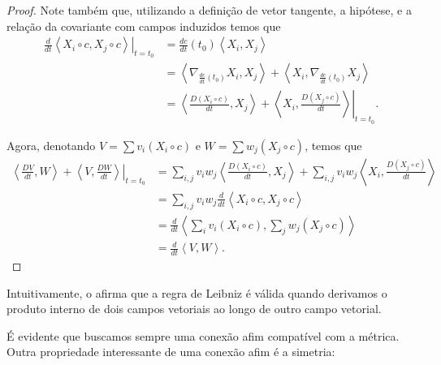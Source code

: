 \begin{corollary}
\begin{proof}
		Note também que, utilizando a definição de vetor tangente, a hipótese, e a relação da covariante com campos induzidos temos que
		\begin{align*}
			\left.\frac{d}{dt}\left<X_{i} \circ  c,X_{j} \circ  c\right>\right|_{t=t_{0}} & = \frac{dc}{dt}(t_{0})\left<X_{i},X_{j}\right>                                                                                \\
			                                                                              & = \left<\nabla_{\frac{dc}{dt}(t_{0})}X_{i},X_{j}\right> + \left<X_{i},\nabla_{\frac{dc}{dt}(t_{0})}X_{j}\right>               \\
			                                                                              & = \left.\left<\frac{D(X_{i} \circ  c)}{dt},X_{j}\right> + \left<X_{i},\frac{D(X_{j} \circ  c)}{dt}\right>  \right|_{t=t_{0}}.
		\end{align*}

		Agora, denotando $V=\sum v_{i}(X_{i}\circ c)$ e $W=\sum w_{j}(X_{j} \circ c)$, temos que
		\begin{align*}
			\left.\left<\frac{DV}{dt},W\right> +\left<V,\frac{DW}{dt}\right> \right|_{t=t_{0}} & = \sum_{i,j}v_{i}w_{j}\left<\frac{D(X_{i} \circ  c)}{dt},X_{j}\right> + \sum_{i,j}v_{i}w_{j}\left<X_{i},\frac{D(X_{j} \circ  c)}{dt}\right> \\
			                                                                                   & =\sum_{i,j}v_{i}w_{j}\frac{d}{dt}\left<X_{i} \circ  c,X_{j} \circ  c\right>                                                                 \\
			                                                                                   & =\frac{d}{dt}\left<\sum_{i}v_{i}(X_{i} \circ  c),\sum_{j}w_{j}(X_{j} \circ  c)\right>                                                       \\
			                                                                                   & =\frac{d}{dt}\left<V,W\right>.
		\end{align*}
	\end{proof}
\end{corollary}
Intuitivamente, o  afirma que a regra de Leibniz  é válida quando derivamos o produto interno de dois campos vetoriais ao longo de outro campo vetorial.

É evidente que buscamos sempre uma conexão afim compatível com a métrica. Outra propriedade interessante de uma conexão afim é a simetria:

